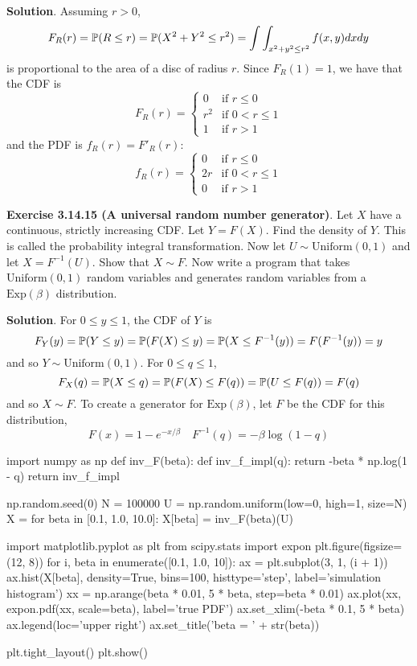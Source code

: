 \textbf{Solution}.
Assuming \(r > 0\),
\[
F_R(r) = \operatorname{\mathbb{P}}(R \leq r) = \operatorname{\mathbb{P}}(X^{2} + Y^{2} \leq r^{2}) = \int \int_{x^{2} + y^{2} \leq r^{2}} f(x, y) dx dy
\]
is proportional to the area of a disc of radius \(r\). Since
\(F_R(1) = 1\), we have that the CDF is
\[
F_R(r) = \begin{cases}
0 &\text{if } r \leq 0 \\
r^{2} &\text{if } 0 < r \leq 1 \\
1 &\text{if } r > 1
\end{cases}
\]
and the PDF is \(f_R(r) = F'_R(r)\):
\[
f_R(r) = \begin{cases}
0 &\text{if } r \leq 0 \\
2 r &\text{if } 0 < r \leq 1 \\
0 &\text{if } r > 1
\end{cases}
\]

\textbf{Exercise 3.14.15 (A universal random number generator)}. Let
\(X\) have a continuous, strictly increasing CDF. Let \(Y = F(X)\). Find
the density of \(Y\). This is called the probability integral
transformation. Now let \(U \sim \text{Uniform}(0, 1)\) and let
\(X = F^{-1}(U)\). Show that \(X \sim F\). Now write a program that
takes \(\text{Uniform}(0, 1)\) random variables and generates random
variables from a \(\text{Exp}(\beta)\) distribution.

\textbf{Solution}.
For \(0 \leq y \leq 1\), the CDF of \(Y\) is
\[
F_Y(y) = \operatorname{\mathbb{P}}(Y \leq y) = \operatorname{\mathbb{P}}(F(X) \leq y) = \operatorname{\mathbb{P}}(X \leq F^{-1}(y)) = F(F^{-1}(y)) = y
\]
and so \(Y \sim \text{Uniform}(0, 1)\).
For \(0 \leq q \leq 1\),
\[
F_X(q) = \operatorname{\mathbb{P}}(X \leq q) = \operatorname{\mathbb{P}}(F(X) \leq F(q)) = \operatorname{\mathbb{P}}(U \leq F(q)) = F(q)
\]
and so \(X \sim F\).
To create a generator for \(\text{Exp}(\beta)\), let \(F\) be the CDF
for this distribution,
\[
F(x) = 1 - e^{-x/\beta} \quad F^{-1}(q) = - \beta \log (1 - q)
\]

\begin{python}
import numpy as np
def inv_F(beta):
    def inv_f_impl(q):
        return -beta * np.log(1 - q)
    return inv_f_impl
\end{python}

\begin{python}
np.random.seed(0)
N = 100000
U = np.random.uniform(low=0, high=1, size=N)
X = {}
for beta in [0.1, 1.0, 10.0]:
    X[beta] = inv_F(beta)(U)
\end{python}

\begin{python}
import matplotlib.pyplot as plt
from scipy.stats import expon
plt.figure(figsize=(12, 8))
for i, beta in enumerate([0.1, 1.0, 10]):
    ax = plt.subplot(3, 1, (i + 1))
    ax.hist(X[beta], density=True, bins=100, histtype='step', label='simulation histogram')
    xx = np.arange(beta * 0.01, 5 * beta, step=beta * 0.01)
    ax.plot(xx, expon.pdf(xx, scale=beta), label='true PDF')
    ax.set_xlim(-beta * 0.1, 5 * beta)
    ax.legend(loc='upper right')
    ax.set_title('beta = ' + str(beta))
    
plt.tight_layout()
plt.show()
\end{python}

